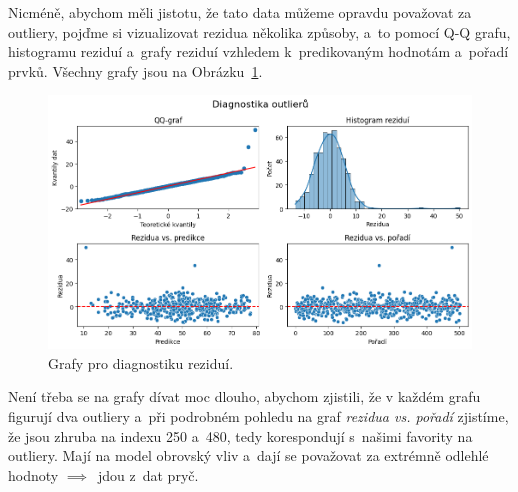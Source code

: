 \documentclass[a4paper, 11pt]{article}
\begin{document}
Nicméně, abychom měli jistotu, že tato data můžeme opravdu považovat za outliery, pojďme si vizualizovat rezidua několika způsoby, a~to pomocí Q-Q grafu, histogramu reziduí a~grafy reziduí vzhledem k~predikovaným hodnotám a~pořadí prvků.
Všechny grafy jsou na Obrázku~\ref{fig:rezidua}.
\begin{figure}[ht]
    \centering
    \includegraphics[width=\textwidth]{img/outlier_diagnostics.png}
    \caption{Grafy pro diagnostiku reziduí.}
    \label{fig:rezidua}
\end{figure}

Není třeba se na grafy dívat moc dlouho, abychom zjistili, že v každém grafu figurují dva outliery a~při podrobném pohledu na graf \emph{rezidua vs. pořadí} zjistíme, že jsou zhruba na indexu 250 a~480, tedy korespondují s~našimi favority na outliery.
Mají na model obrovský vliv a~dají se považovat za extrémně odlehlé hodnoty $\implies$~jdou z~dat pryč.
\end{document}

